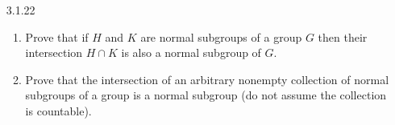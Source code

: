 \begin{enumerate}
      \begin{enumerate}
         \item Since $\cyc{x^2y^2} = \{1, x^2y^2\}$, it follows that each left 
               coset of $\cyc{x^2y^2}$ in $G$ has order 2. Thus
               $|\m{G}| = |G|/2 = 8$.
         \item The elements of $\m{G}$ are:
               \begin{align*}
                  1\cyc{x^2y^2} = \{1, x^2y^2\} &= \m{1}
                     &y\cyc{x^2y^2} = \{y, x^2y^3\} &= \m{y} \\
                  x\cyc{x^2y^2} = \{x, x^3y^2\} &= \m{x}
                     &xy\cyc{x^2y^2} = \{xy, x^3y^3\} &= \m{x}\cdot\m{y} \\
                  x^2\cyc{x^2y^2} = \{x^2, y^2\} &= \m{x}^2
                     &x^2y\cyc{x^2y^2} = \{x^2y, y^3\} &= \m{x}^2 \cdot \m{y} \\
                  x^3\cyc{x^2y^2} = \{x^3, xy^2\} &= \m{x}^3
                     &x^3y\cyc{x^2y^2} = \{x^3y, xy^3\} &= \m{x}^3 \cdot \m{y}
               \end{align*}
         \item The orders of $\m{G}$'s elements are:
               \begin{align*}
                  |\m{1}| &= 1 &|\m{x}| &= 4 &|\m{x}^2| &= 2 &|\m{x}^3| &= 4 \\
                  |\m{y}| &= 4 &|\m{xy}| &= 2 &|\m{x^2y}| &= 4 &|\m{x^3y}| &= 2
               \end{align*}
         \item Now $\m{G}$ is abelian by Exercise 3 and observe that every 
               element of $\m{G}$ can be generated by $\m{x}$ and $\m{xy}$.
               Since $\m{x}^4 = \m{xy}^2 = \m{1}$, it follows that
               $$\m{G} = \cyc{\m{x}, \m{xy} : \m{x}^4 = \m{xy}^2 = \m{1},
                  \m{x}\cdot\m{xy} = \m{xy}\cdot\m{x}}.$$
               Thus $\m{x}$ and $\m{xy}$ in $\m{G}$ satisfy the relations that
               the generators of $Z_2 \times Z_4$ satisfy in Exercise 19(e), so
               that $\m{G} \cong Z_2 \times Z_4$. Conclude by Exercise 1.6.11
               that $\m{G} \cong Z_4 \times Z_2$.
      \end{enumerate} \qed
   \item[3.1.22]  \begin{enumerate}
                     \item Prove that if $H$ and $K$ are normal subgroups of a
                           group $G$ then their intersection $H \cap K$ is also
                           a normal subgroup of $G$.
                     \item Prove that the intersection of an arbitrary nonempty
                           collection of normal subgroups of a group is a normal
                           subgroup (do not assume the collection is countable).
                  \end{enumerate}


\end{enumerate}
